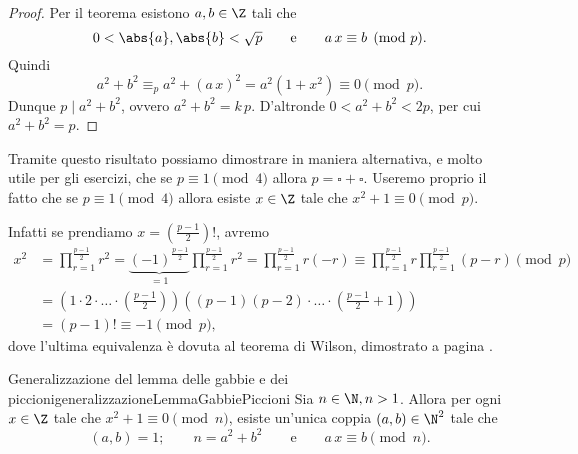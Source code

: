 \begin{proof}
	Per il teorema esistono \(a,b\in \Z\) tali che
	\[
		0 < \abs{a},\abs{b} < \sqrt{p} \qquad\text{e}\qquad a\,x \equiv b \pmod{p}.
	\]
	Quindi
	\[
		a^2+b^2 \equiv_p a^2 +(a\,x)^2 = a^2(1+x^2) \equiv 0 \pmod{p}.
	\]
	Dunque \(p\mid a^2+b^2\), ovvero \(a^2+b^2= k\,p\).
	D'altronde \(0<a^2+b^2 <2p\), per cui \(a^2+b^2=p\).
\end{proof}

\begin{oss}
	Tramite questo risultato possiamo dimostrare in maniera alternativa, e molto utile per gli esercizi, che se \(p\equiv 1 \pmod{4}\) allora \(p = \square+\square\).
	Useremo proprio il fatto che se \(p\equiv 1 \pmod{4}\) allora esiste \(x\in \Z\) tale che \(x^2+1 \equiv 0 \pmod{p}\).

	Infatti se prendiamo \(x= \left(\frac{p-1}{2}\right)!\), avremo
	\[
		\begin{split}
			x^2 & = \prod_{r=1}^{\frac{p-1}{2}} r^2 = \underbrace{(-1)^{\frac{p-1}{2}}}_{=1} \prod_{r=1}^{\frac{p-1}{2}} r^2 = \prod_{r=1}^{\frac{p-1}{2}} r(-r) \equiv \prod_{r=1}^{\frac{p-1}{2}} r \prod_{r=1}^{\frac{p-1}{2}} (p-r) \pmod{p}\\
			& = \left( 1 \cdot 2 \cdot \ldots \cdot \left( \frac{p-1}{2} \right) \right) \left( (p-1)(p-2) \cdot\ldots\cdot \left( \frac{p-1}{2}+1 \right) \right)\\
			& = (p-1)! \equiv -1 \pmod{p},
		\end{split}
	\]
	dove l'ultima equivalenza è dovuta al teorema di Wilson, dimostrato a pagina \pageref{th:3.13}.
\end{oss}

\begin{teor}{Generalizzazione del lemma delle gabbie e dei piccioni}{generalizzazioneLemmaGabbiePiccioni}
	Sia \(n\in \N, n>1\).
	Allora per ogni \(x\in \Z\) tale che \(x^2+1 \equiv 0 \pmod{n}\), esiste un'unica coppia \((a,b)\in \N^2\) tale che
	\[
		(a,b) = 1; \qquad n=a^2+b^2 \qquad\text{e}\qquad a\,x \equiv b \pmod{n}.
	\]
\end{teor}

